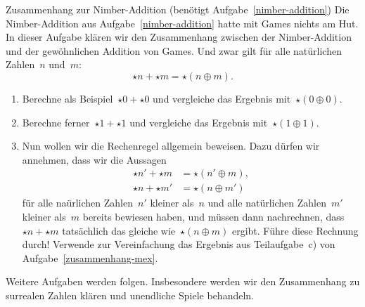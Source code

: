\documentclass{zirkelblatt}
\begin{document}
\begin{aufgabe}{Zusammenhang zur Nimber-Addition (benötigt
Aufgabe~\ref{nimber-addition})}
Die Nimber-Addition aus Aufgabe~\ref{nimber-addition} hatte mit Games nichts am
Hut. In dieser Aufgabe klären wir den Zusammenhang zwischen der Nimber-Addition
und der gewöhnlichen Addition von Games. Und zwar gilt für alle natürlichen
Zahlen~$n$ und~$m$:
\[ \star n + \star m = \star(n \oplus m). \]
\begin{enumerate}
\item Berechne als Beispiel~$\star 0 + \star 0$ und vergleiche das Ergebnis
mit~$\star (0 \oplus 0)$.
\item Berechne ferner~$\star 1 + \star 1$ und vergleiche das Ergebnis
mit~$\star (1 \oplus 1)$.
\item Nun wollen wir die Rechenregel allgemein beweisen. Dazu dürfen wir
annehmen, dass wir die Aussagen
\begin{align*}
  \star n' + \star m &= \star(n' \oplus m), \\
  \star n + \star m' &= \star(n \oplus m')
\end{align*}
für alle naürlichen Zahlen~$n'$ kleiner als~$n$ und alle natürlichen
Zahlen~$m'$ kleiner als~$m$ bereits bewiesen haben, und müssen dann nachrechnen,
dass~$\star n + \star m$ tatsächlich das gleiche wie~$\star(n \oplus m)$
ergibt. Führe diese Rechnung durch! Verwende zur Vereinfachung das Ergebnis aus
Teilaufgabe~c) von Aufgabe~\ref{zusammenhang-mex}.
\end{enumerate}
\end{aufgabe}


Weitere Aufgaben werden folgen. Insbesondere werden wir den Zusammenhang zu
surrealen Zahlen klären und unendliche Spiele behandeln.


\loesungenfalse
\end{document}
